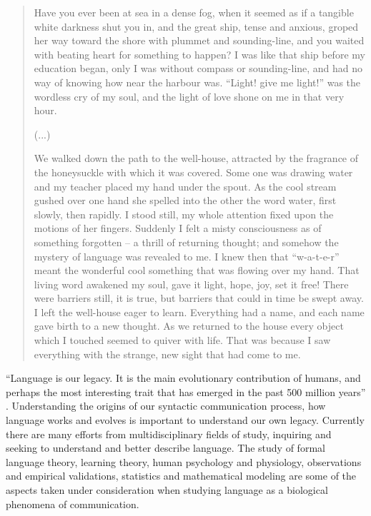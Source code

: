 \begin{quote}
Have you ever been at sea in a dense fog, when it seemed as if a tangible white darkness shut you in, 
and the great ship, tense and anxious, groped her way toward the shore with plummet and sounding-line, 
and you waited with beating heart for something to happen? I was like that ship before my education began, 
only I was without compass or sounding-line, and had no way of knowing how near the harbour was. 
``Light! give me light!'' was the wordless cry of my soul, and the light of love shone on me in that very hour.

(...)

We walked down the path to the well-house, attracted by the fragrance of the honeysuckle with which it was covered. 
Some one was drawing water and my teacher placed my hand under the spout. As the cool stream gushed over one hand 
she spelled into the other the word water, first slowly, then rapidly. I stood still, my whole attention fixed upon 
the motions of her fingers. Suddenly I felt a misty consciousness as of something forgotten -- a thrill of returning 
thought; and somehow the mystery of language was revealed to me. I knew then that ``w-a-t-e-r'' meant the wonderful 
cool something that was flowing over my hand. That living word awakened my soul, gave it light, hope, joy, set it free! 
There were barriers still, it is true, but barriers that could in time be swept away.
I left the well-house eager to learn. Everything had a name, and each name gave birth to a new thought. 
As we returned to the house every object which I touched seemed to quiver with life. 
That was because I saw everything with the strange, new sight that had come to me.
\end{quote}

``Language is our legacy. It is the main evolutionary contribution of humans, and perhaps the most 
interesting trait that has emerged in the past 500 million years'' \citep{nowak2002}. Understanding the origins 
of our syntactic communication process, how language works and evolves is important to understand
our own legacy. Currently there are many efforts from multidisciplinary fields of study, inquiring
and seeking to understand and better describe language. The study of formal language theory, learning
theory, human psychology and physiology, observations and empirical validations, statistics and
mathematical modeling are some of the aspects taken under consideration when studying 
language as a biological phenomena of communication.
